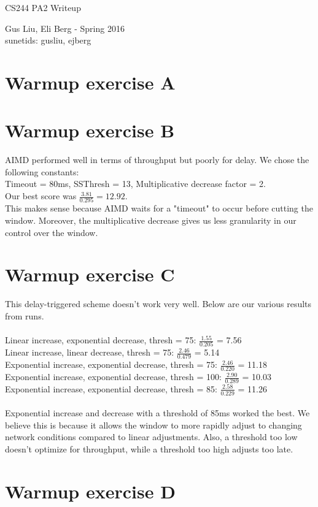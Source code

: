 \documentclass[12pt]{article}
\begin{document}
\begin{center}
{\Large CS244 PA2 Writeup}
\begin{center}
Gus Liu, Eli Berg - Spring 2016 \\
sunetids: gusliu, ejberg
\end{center} 
\end{center}

\section*{Warmup exercise A}
	
	
\section*{Warmup exercise B}
AIMD performed well in terms of throughput but poorly for delay. We chose the following constants:\\
Timeout = 80ms, 
SSThresh = 13, 
Multiplicative decrease factor = 2.\\
Our best score was $\frac{3.81}{0.295} = 12.92$. \\

This makes sense because AIMD waits for a "timeout" to occur before cutting the window. Moreover, the multiplicative decrease gives us less granularity in our control over the window. 
	
\section*{Warmup exercise C}
	This delay-triggered scheme doesn't work very well. Below are our various results from runs.
\\
\\
Linear increase, exponential decrease, thresh = 75: $\frac{1.55}{0.205}$ = 7.56 \\
Linear increase, linear decrease, thresh =  75: $\frac{2.46}{0.479}$ = 5.14 \\
Exponential increase, exponential decrease, thresh =  75: $\frac{2.46}{0.220}$ = 11.18 \\
Exponential increase, exponential decrease, thresh =  100: $\frac{2.90}{0.289}$ = 10.03 \\
Exponential increase, exponential decrease, thresh =  85: $\frac{2.58}{0.229}$ = 11.26 \\
\\
Exponential increase and decrease with a threshold of 85ms worked the best. We believe this is because it allows the window to more rapidly adjust to changing network conditions compared to linear adjustments. Also, a threshold too low doesn't optimize for throughput, while a threshold too high adjusts too late. 

\section*{Warmup exercise D}

	
		
\end{document}
